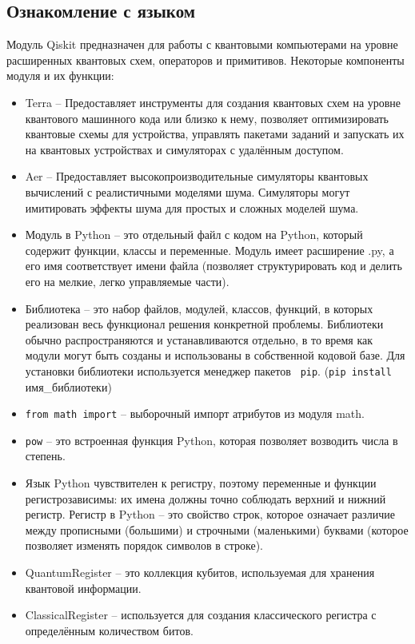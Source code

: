 \documentclass[12pt,a4paper]{article}
\begin{document}
	\subsection{Ознакомление с языком}
	
	
	Модуль Qiskit предназначен для работы с квантовыми компьютерами на уровне расширенных квантовых схем, операторов и примитивов.
	Некоторые компоненты модуля и их функции:
	\begin{itemize}
		\item Terra -- Предоставляет инструменты для создания квантовых схем на уровне квантового машинного кода или близко к нему, позволяет оптимизировать квантовые схемы для устройства, управлять пакетами заданий и запускать их на квантовых устройствах и симуляторах с удалённым доступом.
		\item Aer -- Предоставляет высокопроизводительные симуляторы квантовых вычислений с реалистичными моделями шума. Симуляторы могут имитировать эффекты шума для простых и сложных моделей шума.
		\item Модуль в Python -- это отдельный файл с кодом на Python, который содержит функции, классы и переменные. Модуль имеет расширение .py, а его имя соответствует имени файла (позволяет структурировать код и делить его на мелкие, легко управляемые части).
		\item	Библиотека -- это набор файлов, модулей, классов, функций, в которых реализован весь функционал решения конкретной проблемы. Библиотеки обычно распространяются и устанавливаются отдельно, в то время как модули могут быть созданы и использованы в собственной кодовой базе. Для установки библиотеки используется менеджер пакетов \texttt{ pip}. (\texttt{pip install} имя\_библиотеки)
		\item \texttt{from math import} -- выборочный импорт атрибутов из модуля math.
		\item \texttt{pow} -- это встроенная функция Python, которая позволяет возводить числа в степень.
		\item Язык Python чувствителен к регистру, поэтому переменные и функции регистрозависимы: их имена должны точно соблюдать верхний и нижний регистр. Регистр в Python -- это свойство строк, которое означает различие между прописными (большими) и строчными (маленькими) буквами (которое позволяет изменять порядок символов в строке).
		\item QuantumRegister  -- это коллекция кубитов, используемая для хранения квантовой информации.
		\item	ClassicalRegister -- используется для создания классического регистра с определённым количеством битов.
		

\end{itemize}
\end{document}
